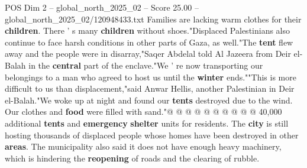 \begin{textsample}{POS Dim 2 – global\_north\_2025\_02 – Score 25.00 – global\_north\_2025\_02/120948433.txt}
Families are lacking warm clothes for their \textbf{children}.
There ' s many \textbf{children} without shoes."Displaced Palestinians also continue to face harsh conditions in other parts of Gaza, as well."The \textbf{tent} flew away and the people were in disarray,"Saqer Abdelal told Al Jazeera from Deir el-Balah in the \textbf{central} part of the enclave."We ' re now transporting our belongings to a man who agreed to host us until the \textbf{winter} ends.""This is more difficult to us than displacement,"said Anwar Hellis, another Palestinian in Deir el-Balah."We woke up at night and found our \textbf{tents} destroyed due to the wind.
Our clothes and \textbf{food} were filled with sand."@ @ @ @ @ @ @ @ @ @ 40,000 additional \textbf{tents} and \textbf{emergency} \textbf{shelter} units for residents.
The \textbf{city} is still hosting thousands of displaced people whose homes have been destroyed in other \textbf{areas}.
The municipality also said it does not have enough heavy machinery, which is hindering the \textbf{reopening} of roads and the clearing of rubble.

\end{textsample}
